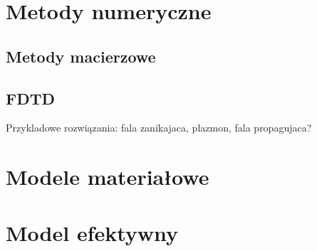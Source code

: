 \section{Metody numeryczne}
\subsection{Metody  macierzowe}
\subsection{FDTD}
Przykladowe rozwiązania: fala zanikajaca, plazmon, fala propagujaca?
\section{Modele materiałowe}
\section{Model efektywny}



